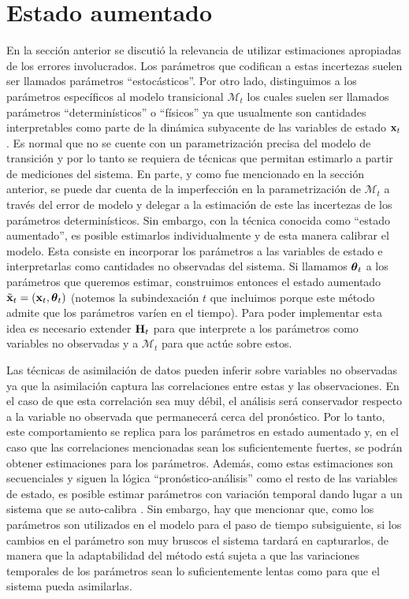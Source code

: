 \section{Estado aumentado} \label{sec:augmented_state}

En la sección anterior se discutió la relevancia de utilizar estimaciones apropiadas de los errores involucrados. Los parámetros que codifican a estas incertezas suelen ser llamados parámetros ``estocásticos''. Por otro lado, distinguimos a los parámetros específicos al modelo transicional $\mathcal{M}_t$ los cuales suelen ser llamados parámetros ``determinísticos'' o ``físicos'' ya que usualmente son cantidades interpretables como parte de la dinámica subyacente de las variables de estado $\mathbf{x}_t$. Es normal que no se cuente con un parametrización precisa del modelo de transición y por lo tanto se requiera de técnicas que permitan estimarlo a partir de mediciones del sistema. En parte, y como fue mencionado en la sección anterior, se puede dar cuenta de la imperfección en la parametrización de $\mathcal{M}_t$ a través del error de modelo y delegar a la estimación de este las incertezas de los parámetros determinísticos. Sin embargo, con la técnica conocida como ``estado aumentado'', es posible estimarlos individualmente y de esta manera calibrar el modelo. Esta consiste en incorporar los parámetros a las variables de estado e interpretarlas como cantidades no observadas del sistema. Si llamamos $\mbox{\boldmath$ \theta $}_t$ a los parámetros que queremos estimar, construimos entonces el estado aumentado $\tilde{\mathbf{x}}_t = (\mathbf{x}_t, \mbox{\boldmath$ \theta $}_t)$ (notemos la subindexación $t$ que incluimos porque este método admite que los parámetros varíen en el tiempo). Para poder implementar esta idea es necesario extender $\mathbf{H}_t$ para que interprete a los parámetros como variables no observadas y a $\mathcal{M}_t$ para que actúe sobre estos.

Las técnicas de asimilación de datos pueden inferir sobre variables no observadas ya que la asimilación captura las correlaciones entre estas y las observaciones. En el caso de que esta correlación sea muy débil, el análisis será conservador respecto a la variable no observada que permanecerá cerca del pronóstico. Por lo tanto, este comportamiento se replica para los parámetros en estado aumentado y, en el caso que las correlaciones mencionadas sean los suficientemente fuertes, se podrán obtener estimaciones para los parámetros. Además, como estas estimaciones son secuenciales y siguen la lógica ``pronóstico-análisis'' como el resto de las variables de estado, es posible estimar parámetros con variación temporal dando lugar a un sistema que se auto-calibra \citep{Annan2004, Ruiz2013a}. Sin embargo, hay que mencionar que, como los parámetros son utilizados en el modelo para el paso de tiempo subsiguiente, si los cambios en el parámetro son muy bruscos el sistema tardará en capturarlos, de manera que la adaptabilidad del método está sujeta a que las variaciones temporales de los parámetros sean lo suficientemente lentas como para que el sistema pueda asimilarlas. 

